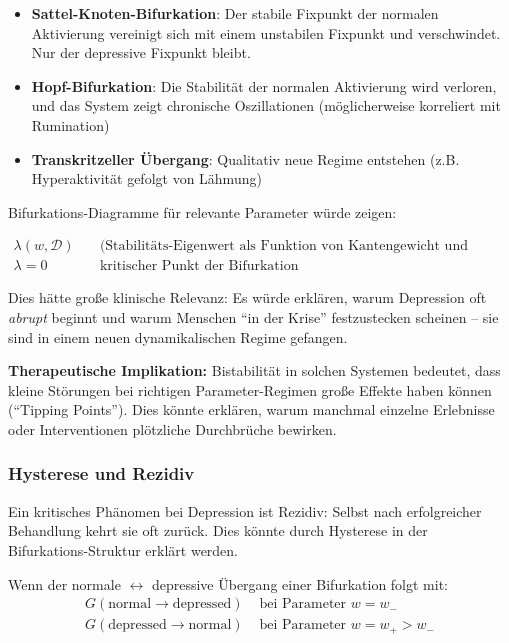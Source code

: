 \documentclass[a4paper,12pt]{article}
\theoremstyle{definition}
\begin{document}
\begin{itemize}
	\item \textbf{Sattel-Knoten-Bifurkation}: Der stabile Fixpunkt der normalen Aktivierung vereinigt sich mit einem unstabilen Fixpunkt und verschwindet. Nur der depressive Fixpunkt bleibt.
	\item \textbf{Hopf-Bifurkation}: Die Stabilität der normalen Aktivierung wird verloren, und das System zeigt chronische Oszillationen (möglicherweise korreliert mit Rumination)
	\item \textbf{Transkritzeller Übergang}: Qualitativ neue Regime entstehen (z.B. Hyperaktivität gefolgt von Lähmung)
\end{itemize}

Bifurkations-Diagramme für relevante Parameter würde zeigen:

\begin{equation}
\begin{split}
\lambda(w, \mathcal{D}) &\quad \text{(Stabilitäts-Eigenwert als Funktion von Kantengewicht und Depotenzierung)} \\
\lambda = 0 &\quad \text{kritischer Punkt der Bifurkation}
\end{split}
\end{equation}

Dies hätte große klinische Relevanz: Es würde erklären, warum Depression oft \textit{abrupt} beginnt und warum Menschen ``in der Krise'' festzustecken scheinen -- sie sind in einem neuen dynamikalischen Regime gefangen.

\textbf{Therapeutische Implikation:} Bistabilität in solchen Systemen bedeutet, dass kleine Störungen bei richtigen Parameter-Regimen große Effekte haben können (``Tipping Points''). Dies könnte erklären, warum manchmal einzelne Erlebnisse oder Interventionen plötzliche Durchbrüche bewirken.

\subsubsection{Hysterese und Rezidiv}

Ein kritisches Phänomen bei Depression ist Rezidiv: Selbst nach erfolgreicher Behandlung kehrt sie oft zurück. Dies könnte durch Hysterese in der Bifurkations-Struktur erklärt werden.

Wenn der normale $\leftrightarrow$ depressive Übergang einer Bifurkation folgt mit:
\begin{equation}
\begin{split}
G(\text{normal} \to \text{depressed}) &\text{ bei Parameter } w = w_- \\
G(\text{depressed} \to \text{normal}) &\text{ bei Parameter } w = w_+ > w_-
\end{split}
\end{equation}
\end{document}
